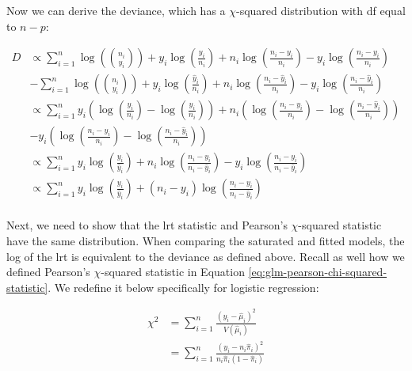 \documentclass{report}
\begin{document}
Now we can derive the deviance, which has a $\chi$-squared distribution with \gls{df} equal to $n-p$:

\begin{equation}\label{eq:ex-glm-2023-q5-overall-deviance-2}
    \begin{split}
        D
          &\propto \sum_{i=1}^n \log\left(\binom{n_i}{y_i}\right) + y_i\log\left(\frac{y_i}{n_i}\right) + n_i\log\left(\frac{n_i-y_i}{n_i}\right) - y_i\log\left(\frac{n_i-y_i}{n_i}\right) \\ &-  \sum_{i=1}^n \log\left(\binom{n_i}{y_i}\right) + y_i\log\left(\frac{\hat{y}_i}{n_i}\right) + n_i\log\left(\frac{n_i - \hat{y}_i}{n_i}\right) - y_i\log\left(\frac{n_i - \hat{y}_i}{n_i}\right) \\
          &\propto \sum_{i=1}^n y_i \left(\log\left(\frac{y_i}{n_i}\right) - \log\left(\frac{\hat{y}_i}{n_i}\right)\right) + n_i \left(\log\left(\frac{n_i-y_i}{n_i}\right) - \log\left(\frac{n_i-\hat{y}_i}{n_i}\right)\right) \\ &- y_i \left(\log\left(\frac{n_i-y_i}{n_i}\right) - \log\left(\frac{n_i - \hat{y}_i}{n_i}\right)\right) \\
          &\propto \sum_{i=1}^n y_i \log\left(\frac{y_i}{\hat{y}_i}\right) + n_i \log\left(\frac{n_i-y_i}{n_i-\hat{y}_i}\right) - y_i\log\left(\frac{n_i-y_i}{n_i-\hat{y}_i}\right) \\
          &\propto \sum_{i=1}^n y_i \log\left(\frac{y_i}{\hat{y}_i}\right) + (n_i-y_i) \log\left(\frac{n_i-y_i}{n_i-\hat{y}_i}\right) \\
    \end{split}
\end{equation}

Next, we need to show that the \gls{lrt} statistic and Pearson's $\chi$-squared statistic have the same distribution. When comparing the saturated and fitted models, the log of the \gls{lrt} is equivalent to the deviance as defined above. Recall as well how we defined Pearson's $\chi$-squared statistic in Equation \ref{eq:glm-pearson-chi-squared-statistic}. We redefine it below specifically for logistic regression:

\begin{equation}\label{eq:ex-glm-2023q5-pearsons-statistic}
    \begin{aligned}
        \chi^2 
          &= \sum_{i=1}^n \frac{\left(y_i - \hat{\mu}_i\right)^2}{V\left(\hat{\mu}_i\right)} \\
          &= \sum_{i=1}^n \frac{\left(y_i - n_i\hat{\pi}_i\right)^2}{n_i\hat{\pi}_i\left(1-\hat{\pi}_i\right)} \\
    \end{aligned}
\end{equation}
\end{document}
